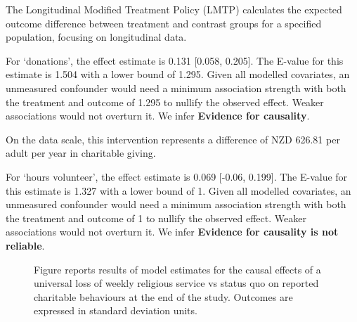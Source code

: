 \documentclass[
  single column]{article}
\begin{document}
The Longitudinal Modified Treatment Policy (LMTP) calculates the
expected outcome difference between treatment and contrast groups for a
specified population, focusing on longitudinal data.

For `donations', the effect estimate is 0.131 {[}0.058, 0.205{]}. The
E-value for this estimate is 1.504 with a lower bound of 1.295. Given
all modelled covariates, an unmeasured confounder would need a minimum
association strength with both the treatment and outcome of 1.295 to
nullify the observed effect. Weaker associations would not overturn it.
We infer \textbf{Evidence for causality}.

On the data scale, this intervention represents a difference of NZD
626.81 per adult per year in charitable giving.

For `hours volunteer', the effect estimate is 0.069 {[}-0.06, 0.199{]}.
The E-value for this estimate is 1.327 with a lower bound of 1. Given
all modelled covariates, an unmeasured confounder would need a minimum
association strength with both the treatment and outcome of 1 to nullify
the observed effect. Weaker associations would not overturn it. We infer
\textbf{Evidence for causality is not reliable}.

\newpage{}

\begin{figure}


\caption{\label{fig-1_3}Figure reports results of model estimates for
the causal effects of a universal loss of weekly religious service vs
status quo on reported charitable behaviours at the end of the study.
Outcomes are expressed in standard deviation units.}

\end{figure}%
\end{document}
